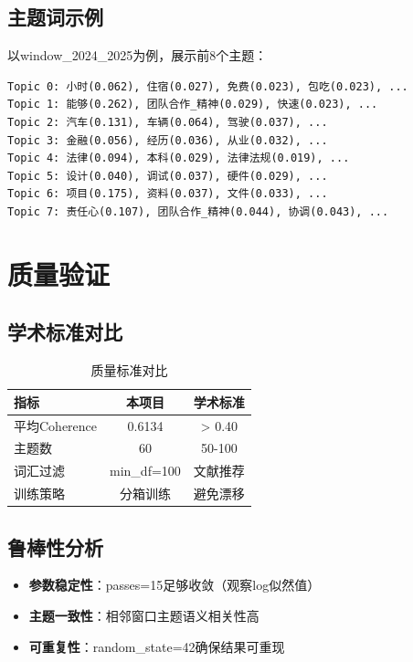 \documentclass[11pt,a4paper]{article}
\begin{document}
\subsection{主题词示例}

以window\_2024\_2025为例，展示前8个主题：

\begin{verbatim}
Topic 0: 小时(0.062), 住宿(0.027), 免费(0.023), 包吃(0.023), ...
Topic 1: 能够(0.262), 团队合作_精神(0.029), 快速(0.023), ...
Topic 2: 汽车(0.131), 车辆(0.064), 驾驶(0.037), ...
Topic 3: 金融(0.056), 经历(0.036), 从业(0.032), ...
Topic 4: 法律(0.094), 本科(0.029), 法律法规(0.019), ...
Topic 5: 设计(0.040), 调试(0.037), 硬件(0.029), ...
Topic 6: 项目(0.175), 资料(0.037), 文件(0.033), ...
Topic 7: 责任心(0.107), 团队合作_精神(0.044), 协调(0.043), ...
\end{verbatim}

\section{质量验证}

\subsection{学术标准对比}

\begin{table}[h]
\centering
\begin{tabular}{lcc}
\toprule
\textbf{指标} & \textbf{本项目} & \textbf{学术标准} \\
\midrule
平均Coherence & 0.6134 & > 0.40 \\
主题数 & 60 & 50-100 \\
词汇过滤 & min\_df=100 & 文献推荐 \\
训练策略 & 分箱训练 & 避免漂移 \\
\bottomrule
\end{tabular}
\caption{质量标准对比}
\end{table}

\subsection{鲁棒性分析}

\begin{itemize}
    \item \textbf{参数稳定性}：passes=15足够收敛（观察log似然值）
    \item \textbf{主题一致性}：相邻窗口主题语义相关性高
    \item \textbf{可重复性}：random\_state=42确保结果可重现
\end{itemize}
\end{document}

